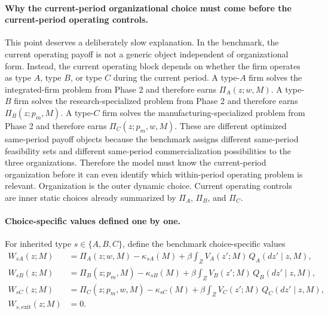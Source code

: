 \paragraph{Why the current-period organizational choice must come before the current-period operating controls.}
This point deserves a deliberately slow explanation. In the benchmark, the current operating payoff is not a generic object independent of organizational form. Instead, the current operating block depends on whether the firm operates as type $A$, type $B$, or type $C$ during the current period. A type-$A$ firm solves the integrated-firm problem from Phase 2 and therefore earns $\Pi_A(z;w,M)$. A type-$B$ firm solves the research-specialized problem from Phase 2 and therefore earns $\Pi_B(z;p_m,M)$. A type-$C$ firm solves the manufacturing-specialized problem from Phase 2 and therefore earns $\Pi_C(z;p_m,w,M)$. These are different optimized same-period payoff objects because the benchmark assigns different same-period feasibility sets and different same-period commercialization possibilities to the three organizations. Therefore the model must know the current-period organization before it can even identify which within-period operating problem is relevant. Organization is the outer dynamic choice. Current operating controls are inner static choices already summarized by $\Pi_A$, $\Pi_B$, and $\Pi_C$.

\paragraph{Choice-specific values defined one by one.}
For inherited type $s\in\{A,B,C\}$, define the benchmark choice-specific values
\begin{align*}
W_{sA}(z;M)
&=
\Pi_A(z;w,M)-\kappa_{sA}(M)
+\beta\int_Z V_A(z';M)\,Q_A(dz'\mid z,M),\\
W_{sB}(z;M)
&=
\Pi_B(z;p_m,M)-\kappa_{sB}(M)
+\beta\int_Z V_B(z';M)\,Q_B(dz'\mid z,M),\\
W_{sC}(z;M)
&=
\Pi_C(z;p_m,w,M)-\kappa_{sC}(M)
+\beta\int_Z V_C(z';M)\,Q_C(dz'\mid z,M),\\
W_{s,\mathrm{exit}}(z;M)
&=0.
\end{align*}

